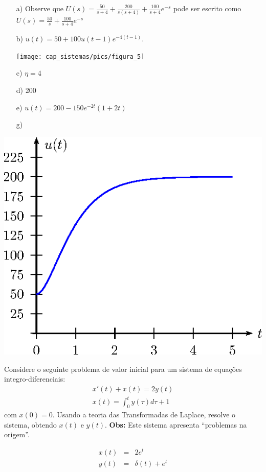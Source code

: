 \begin{resp}
\begin{itemize}
 \item [a)] Observe que $U(s)=\frac{50}{s+4}+\frac{200}{s(s+4)}+\frac{100}{s+4}e^{-s}$ pode ser escrito como $U(s)=\frac{50}{s}+\frac{100}{s+4}e^{-s}$ 
  \item [b)] $u(t)=50+100u(t-1)e^{-4(t-1)}$.
  \begin{center}

\texttt{[image: cap\_sistemas/pics/figura\_5]}\end{center}
  \item [c)] $\eta=4$
 \item [d)] 200
 \item[e)] $u(t)=200-150e^{-2t}\left(1+2t\right)$
 \item [g)] 
\end{itemize}
\begin{center}

\includegraphics{cap_sistemas/pics/figura_6}\end{center}
\end{resp}
\begin{exer} Considere o seguinte problema de valor inicial para um sistema de equações integro-diferenciais:
\begin{eqnarray*}
 x'(t) +x(t) = 2 y(t)\\
 x(t) = \int_0^t y(\tau) d\tau + 1
\end{eqnarray*}
com $x(0)=0$. Usando a teoria das Transformadas de Laplace, resolve o sistema, obtendo $x(t)$ e $y(t)$.
{\bf Obs:}  Este sistema apresenta ``problemas na origem''. 
\end{exer}
\begin{resp}
 \begin{eqnarray}
  x(t)&=&2e^t  \\
  y(t)&=&\delta(t)+e^t
 \end{eqnarray}
\end{resp}


